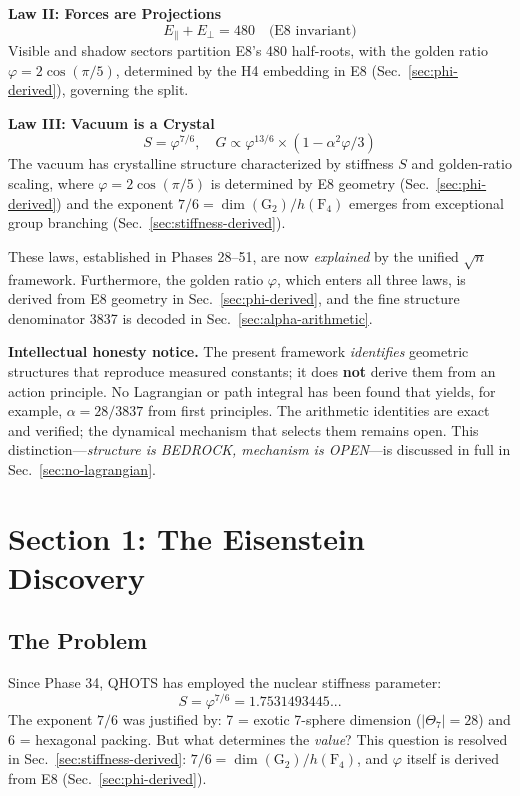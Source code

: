 \documentclass[aps,prd,twocolumn,superscriptaddress,floatfix,nofootinbib]{revtex4-2}
\theoremstyle{definition}
\theoremstyle{remark}
\newcommand{\vp}{\varphi}
\newcommand{\Th}{\Theta}
\begin{document}
\textbf{Law II: Forces are Projections}
\begin{equation}
E_\parallel + E_\perp = 480 \quad \text{(E8 invariant)}
\end{equation}
Visible and shadow sectors partition E8's 480 half-roots, with the golden ratio $\vp = 2\cos(\pi/5)$, determined by the H4 embedding in E8 (Sec.~\ref{sec:phi-derived}), governing the split.

\textbf{Law III: Vacuum is a Crystal}
\begin{equation}
S = \vp^{7/6}, \quad G \propto \vp^{13/6} \times (1 - \alpha^2\vp/3)
\end{equation}
The vacuum has crystalline structure characterized by stiffness $S$ and golden-ratio scaling, where $\vp = 2\cos(\pi/5)$ is determined by E8 geometry (Sec.~\ref{sec:phi-derived}) and the exponent $7/6 = \dim(\text{G}_2)/h(\text{F}_4)$ emerges from exceptional group branching (Sec.~\ref{sec:stiffness-derived}).

These laws, established in Phases 28--51, are now \textit{explained} by the unified $\sqrt{n}$ framework. Furthermore, the golden ratio $\vp$, which enters all three laws, is derived from E8 geometry in Sec.~\ref{sec:phi-derived}, and the fine structure denominator 3837 is decoded in Sec.~\ref{sec:alpha-arithmetic}.

\medskip
\noindent\textbf{Intellectual honesty notice.}
The present framework \textit{identifies} geometric structures that reproduce measured constants; it does \textbf{not} derive them from an action principle. No Lagrangian or path integral has been found that yields, for example, $\alpha = 28/3837$ from first principles. The arithmetic identities are exact and verified; the dynamical mechanism that selects them remains open. This distinction---\textit{structure is BEDROCK, mechanism is OPEN}---is discussed in full in Sec.~\ref{sec:no-lagrangian}.

\section{Section 1: The Eisenstein Discovery}

\subsection{The Problem}

Since Phase 34, QHOTS has employed the nuclear stiffness parameter:
\begin{equation}
S = \vp^{7/6} = 1.7531493445...
\end{equation}
The exponent $7/6$ was justified by: 7 = exotic 7-sphere dimension ($|\Th_7| = 28$) and 6 = hexagonal packing. But what determines the \textit{value}? This question is resolved in Sec.~\ref{sec:stiffness-derived}: $7/6 = \dim(\text{G}_2)/h(\text{F}_4)$, and $\vp$ itself is derived from E8 (Sec.~\ref{sec:phi-derived}).
\end{document}
